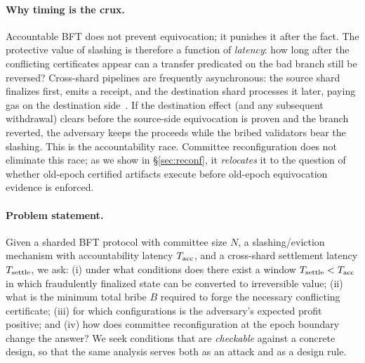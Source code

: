 \paragraph{Why timing is the crux.}
Accountable BFT does not prevent equivocation; it punishes it after the fact. The protective value
of slashing is therefore a function of \emph{latency}: how long after the conflicting certificates
appear can a transfer predicated on the bad branch still be reversed? Cross-shard pipelines are
frequently asynchronous: the source shard finalizes first, emits a receipt, and the destination
shard processes it later, paying gas on the destination side~\cite{harmony2019whitepaper}. If the
destination effect (and any subsequent withdrawal) clears before the source-side equivocation is
proven and the branch reverted, the adversary keeps the proceeds while the bribed validators bear
the slashing. This is the accountability race. Committee reconfiguration does not eliminate this
race; as we show in \S\ref{sec:reconf}, it \emph{relocates} it to the question of whether
old-epoch certified artifacts execute before old-epoch equivocation evidence is enforced.

\paragraph{Problem statement.}
Given a sharded BFT protocol with committee size $N$, a slashing/eviction mechanism with
accountability latency $T_{\mathrm{acc}}$, and a cross-shard settlement latency $T_{\mathrm{settle}}$, we ask:
(i) under what conditions does there exist a window $T_{\mathrm{settle}} < T_{\mathrm{acc}}$ in which fraudulently
finalized state can be converted to irreversible value; (ii) what is the minimum total bribe $B$
required to forge the necessary conflicting certificate; (iii) for which configurations is the
adversary's expected profit positive; and (iv) how does committee reconfiguration at the epoch
boundary change the answer? We seek conditions that are \emph{checkable} against a concrete
design, so that the same analysis serves both as an attack and as a design rule.
